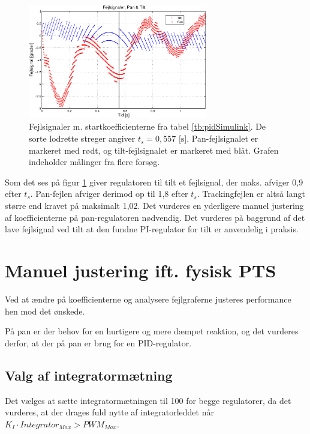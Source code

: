 \begin{figure}[h!]
\centering
\includegraphics[width=0.7\textwidth]{./graphics/pidPhys1.eps}
\captionsetup{width=0.6\textwidth}
\caption[Fejlsignaler m. startkoefficienter]{Fejlsignaler m. startkoefficienterne fra tabel \ref{tb:pidSimulink}.
	De sorte lodrette streger angiver \(t_s=0,557 \text{ [s]}\).
	Pan-fejlsignalet er markeret med rødt, og tilt-fejlsignalet er markeret med blåt.
	Grafen indeholder målinger fra flere forsøg.} 
\label{fig:pidPhys1}
\end{figure}


Som det ses på figur \ref{fig:pidPhys1} giver regulatoren til tilt et fejlsignal,
der maks. afviger 0,9\degree{} efter \(t_s\).
Pan-fejlen afviger derimod op til 1,8\degree{} efter \(t_s\).
Trackingfejlen er altså langt større end kravet på maksimalt 1,02\degree.
Det vurderes en yderligere manuel justering af koefficienterne på pan-regulatoren nødvendig.
Det vurderes på baggrund af det lave fejlsignal ved tilt at den fundne
PI-regulator for tilt er anvendelig i praksis.


\section{Manuel justering ift. fysisk PTS}
Ved at ændre på koefficienterne og analysere fejlgraferne justeres performance 
hen mod det ønskede.

På pan er der behov for en hurtigere og mere dæmpet reaktion,
og det vurderes derfor, at der på pan er brug for en PID-regulator.

\subsection{Valg af integratormætning}
Det vælges at sætte integratormætningen til 100 for begge regulatorer, da det vurderes, at der drages
fuld nytte af integratorleddet når \( K_I \cdot Integrator_{Max} > PWM_{Max} \).

